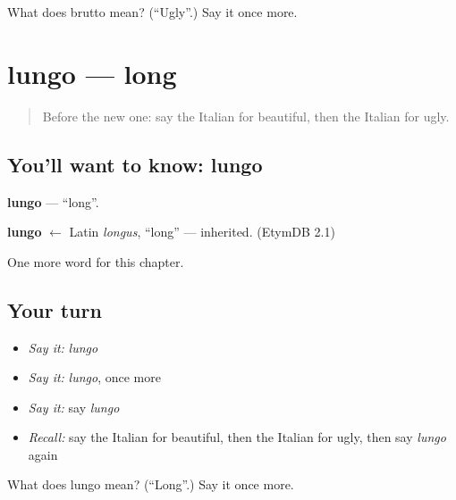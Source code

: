 \begin{tcolorbox}[breakable,colback=teal!4,colframe=teal!35!black,title={Before you move on}]
What does brutto mean? (\textquotedblleft{}Ugly\textquotedblright{}.) Say it once more.
\end{tcolorbox}
\section[lungo]{lungo — long}

\label{lesson:IT-C73-lungo}



\begin{quote}
Before the new one: say the Italian for beautiful, then the Italian for ugly.
\end{quote}

\subsection*{You'll want to know: lungo}
\textbf{lungo} — \textquotedblleft{}long\textquotedblright{}.

\begin{cousinweb}
\textbf{lungo} $\leftarrow$ Latin \emph{longus}, \textquotedblleft{}long\textquotedblright{} — inherited. (EtymDB 2.1)
\end{cousinweb}

\begin{grammarlens}[title={What you've built}]
One more word for this chapter.
\end{grammarlens}

\subsection*{Your turn}
\begin{itemize}
\raggedright
  \item \emph{Say it:} \emph{lungo}
  \item \emph{Say it:} \emph{lungo}, once more
  \item \emph{Say it:} say \emph{lungo}
  \item \emph{Recall:} say the Italian for beautiful, then the Italian for ugly, then say \emph{lungo} again
\end{itemize}

\begin{tcolorbox}[breakable,colback=teal!4,colframe=teal!35!black,title={Before you move on}]
What does lungo mean? (\textquotedblleft{}Long\textquotedblright{}.) Say it once more.
\end{tcolorbox}
